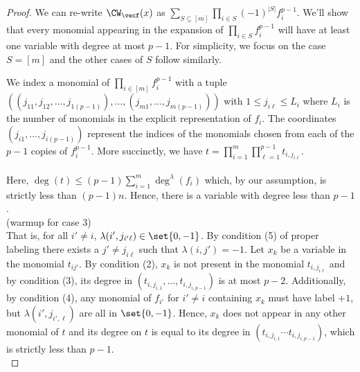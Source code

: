 \begin{proof}
We can re-write $\CW_{\vecf}(x)$ as
$\sum_{S \subseteq [m]} \prod_{i \in S} (-1)^{|S|} f_i^{p-1}$.
We'll show that every monomial appearing in the expansion of
$\prod_{i \in S} f_i^{p-1}$ will have at least one variable with degree at most
$p-1$. For simplicity, we focus on the case $S = [m]$ and the other cases of
$S$ follow similarly.

We index a monomial of $\prod_{i \in [m]} f_i^{p-1}$ with a tuple
$((j_{11},j_{12}, \dots, j_{1(p-1)}), \dots, (j_{m1}, \dots, j_{m(p-1)}))$ with
$1 \leq j_{i\ell} \leq L_{i}$ where $L_i$ is the number of monomials in the
explicit representation of $f_i$.
The coordinates $(j_{i1}, \dots, j_{i(p-1)})$ represent the indices of the
monomials chosen from each of the $p-1$ copies of $f_i^{p-1}$. More succinctly,
we have $t = \prod_{i=1}^m \prod_{\ell=1}^{p-1} t_{i,j_{i\ell}}$.\\[-0.8mm]

\\
Here, $\deg(t) \le (p-1) \sum_{i=1}^m \deg^{\lambda}(f_i)$ which, by our assumption, is strictly less than $(p-1)n$. Hence, there is a variable with degree less than $p-1$.\\[-0.8mm]

 (warmup for case 3)\\
That is, for all $i'\neq i$, $\lambda(i',j_{i'\ell})  \in \set{0, -1}$. By condition (5) of proper labeling there exists a $j' \neq j_{i\ell}$ such that  $\lambda(i,j') = -1$. Let $x_k$ be a variable in the monomial $t_{ij'}$. By condition (2), $x_k$ is not present in the monomial $t_{i,j_{i\ell}}$ and by condition (3), its degree in $(t_{i,j_{i,1}}, \dots, t_{i,j_{i,p-1}})$ is at most $p-2$. Additionally, by condition (4), any monomial of $f_{i'}$ for $i' \neq i$ containing $x_k$ must have label $+1$, but $\lambda(i',j_{i',\ell})$ are all in $\set{0, -1}$. Hence, $x_k$ does not appear in any other monomial of $t$ and its degree on $t$ is equal to its degree in $(t_{i,j_{i,1}} \cdots t_{i,j_{i,p-1}})$, which is strictly less than $p-1$.\\[-0.8mm]


\end{proof}
